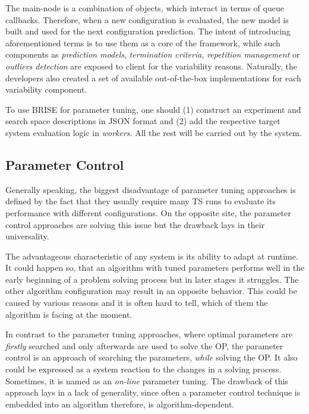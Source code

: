 The main-node is a combination of objects, which interact in terms of queue callbacks. Therefore, when a new configuration is evaluated, the new model is built and used for the next configuration prediction. The intent of introducing aforementioned terms is to use them as a core of the framework, while such components as \emph{prediction models}, \emph{termination criteria}, \emph{repetition management} or \emph{outliers detection} are exposed to client for the variability reasons. Naturally, the developers also created a set of available out-of-the-box implementations for each variability component.

To use BRISE for parameter tuning, one should (1) construct an experiment and search space descriptions in JSON format and (2) add the respective target system evaluation logic in \emph{workers}. All the rest will be carried out by the system.


\subsection{Parameter Control}\label{bg: parameter control}
Generally speaking, the biggest disadvantage of parameter tuning approaches is defined by the fact that they usually require many TS runs to evaluate its performance with different configurations. On the opposite site, the parameter control approaches are solving this issue but the drawback lays in their universality.

The advantageous characteristic of any system is its ability to adapt at runtime.
It could happen so, that an algorithm with tuned parameters performs well in the early beginning of a problem solving process but in later stages it struggles. The other algorithm configuration may result in an opposite behavior. This could be caused by various reasons and it is often hard to tell, which of them the algorithm is facing at the moment. 

In contrast to the parameter tuning approaches, where optimal parameters are \emph{firstly} searched and only afterwards are used to solve the OP, the parameter control is an approach of searching the parameters, \emph{while} solving the OP. It also could be expressed as a system reaction to the changes in a solving process. Sometimes, it is named as an \emph{on-line} parameter tuning. The drawback of this approach lays in a lack of generality, since often a parameter control technique is embedded into an algorithm therefore, is algorithm-dependent.

